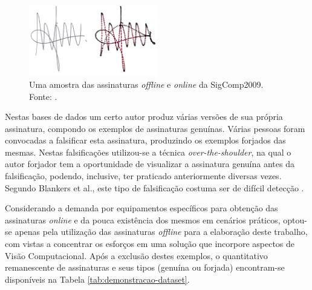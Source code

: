 \begin{figure}[h!]
\centering
\caption{Uma amostra das assinaturas \emph{offline} e \emph{online} da SigComp2009. Fonte: \cite{icdar2009}.}
\label{fig:sample-signature}
\includegraphics[width=0.5\textwidth]{imgs/sample-signature}
\end{figure}

Nestas bases de dados um certo autor produz várias versões de sua própria assinatura, compondo os exemplos de assinaturas genuínas. Várias pessoas foram convocadas a falsificar esta assinatura, produzindo os exemplos forjados das mesmas. Nestas falsificações utilizou-se a técnica \emph{over-the-shoulder}, na qual o autor forjador tem a oportunidade de visualizar a assinatura genuína antes da falsificação, podendo, inclusive, ter praticado anteriormente diversas vezes. Segundo Blankers et al., este tipo de falsificação costuma ser de difícil detecção \cite{icdar2009}.

Considerando a demanda por equipamentos específicos para obtenção das assinaturas \emph{online} e da pouca existência dos mesmos em cenários práticos, optou-se apenas pela utilização das assinaturas \emph{offline} para a elaboração deste trabalho, com vistas a concentrar os esforços em uma solução que incorpore aspectos de Visão Computacional. Após a exclusão destes exemplos, o quantitativo remanescente de assinaturas e seus tipos (genuína ou forjada) encontram-se disponíveis na Tabela \ref{tab:demonstracao-dataset}.

\begin{table}[h!]
	\centering
	\caption{Quantitativo de indivíduos e assinaturas \emph{offline} por conjunto de dados.}
	\label{tab:demonstracao-dataset}
\end{table}

